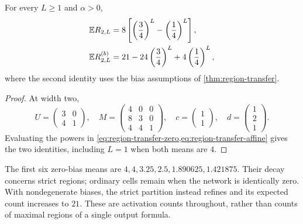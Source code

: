 \begin{proposition}\label{prop:width-two-mean}
For every $L\ge1$ and $\alpha>0$,
\begin{align}
\mathbb{E} R_{2,L}
&=8\left[\left(\frac34\right)^L-\left(\frac14\right)^L\right],\label{eq:width-two-mean}\\
\mathbb{E} R^{(b)}_{2,L}
&=21-24\left(\frac34\right)^L+4\left(\frac14\right)^L,\label{eq:width-two-affine-mean}
\end{align}
where the second identity uses the bias assumptions of \cref{thm:region-transfer}.
\end{proposition}

\begin{proof}
At width two,
\[
U=\begin{pmatrix}3&0\\4&1\end{pmatrix},\quad
M=\begin{pmatrix}4&0&0\\8&3&0\\4&4&1\end{pmatrix},\quad
c=\begin{pmatrix}1\\1\end{pmatrix},\quad
d=\begin{pmatrix}1\\2\\1\end{pmatrix}.
\]
Evaluating the powers in \cref{eq:region-transfer-zero,eq:region-transfer-affine} gives the two identities, including $L=1$ when both means are $4$.
\end{proof}

The first six zero-bias means are $4,4,3.25,2.5,1.890625,1.421875$. Their decay concerns strict regions; ordinary cells remain when the network is identically zero. With nondegenerate biases, the strict partition instead refines and its expected count increases to $21$. These are activation counts throughout, rather than counts of maximal regions of a single output formula.
